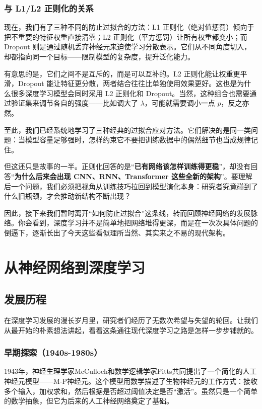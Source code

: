 \documentclass[lang=cn,zihao=-4,a4paper,fontset=windows]{beautybook}
\begin{document}
\subsubsection*{与 L1/L2 正则化的关系}

现在，我们有了三种不同的防止过拟合的方法：L1 正则化（绝对值惩罚）倾向于把不重要的特征权重直接清零；L2 正则化（平方惩罚）让所有权重都变小；而 Dropout 则是通过随机丢弃神经元来迫使学习分散表示。它们从不同角度切入，却都指向同一个目标——限制模型的复杂度，提升泛化能力。

有意思的是，它们之间不是互斥的，而是可以互补的。L2 正则化能让权重更平滑，Dropout 能让特征更分散，两者结合往往比单独使用效果更好。这也是为什么很多深度学习模型会同时采用 L2 正则化和 Dropout。当然，这种组合也需要通过验证集来调节各自的强度——比如调大了 \(\lambda\)，可能就需要调小一点 \(p\)，反之亦然。

至此，我们已经系统地学习了三种经典的过拟合应对方法。它们解决的是同一类问题：当模型容量足够强时，怎样约束它不要把训练数据中的偶然细节也当成规律记住。

但这还只是故事的一半。正则化回答的是“\textbf{已有网络该怎样训练得更稳}”，却没有回答“\textbf{为什么后来会出现 CNN、RNN、Transformer 这些全新的架构}”。要理解后一个问题，我们必须把视角从训练技巧拉回到模型演化本身：研究者究竟碰到了什么旧瓶颈，才会推动新结构不断出现？

因此，接下来我们暂时离开“如何防止过拟合”这条线，转而回顾神经网络的发展脉络。你会看到，深度学习并不是简单地把网络堆得更深，而是在一次次具体问题的倒逼下，逐渐长出了今天这些看似理所当然、其实来之不易的现代架构。

\section{从神经网络到深度学习}

\subsection{发展历程}
在深度学习发展的漫长岁月里，研究者们经历了无数次希望与失望的轮回。让我们从最开始的朴素想法讲起，看看这条通往现代深度学习之路是怎样一步步铺就的。

\subsubsection*{早期探索（1940s-1980s）}

1943年，神经生理学家McCulloch和数学逻辑学家Pitts共同提出了一个简化的人工神经元模型——M-P神经元。这个模型用数学描述了生物神经元的工作方式：接收多个输入，加权求和，然后根据是否超过阈值决定是否“激活”。虽然只是一个简单的数学抽象，但它为后来的人工神经网络奠定了基础。
\end{document}
